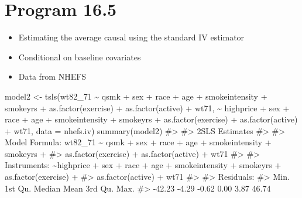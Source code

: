 \documentclass[
  10pt,
  a4paper,
]{book}
\newenvironment{Shaded}{\begin{snugshade}}{\end{snugshade}}
\newcommand{\AttributeTok}[1]{\textcolor[rgb]{0.40,0.45,0.13}{#1}}
\newcommand{\CommentTok}[1]{\textcolor[rgb]{0.37,0.37,0.37}{#1}}
\newcommand{\FunctionTok}[1]{\textcolor[rgb]{0.28,0.35,0.67}{#1}}
\newcommand{\NormalTok}[1]{\textcolor[rgb]{0.00,0.46,0.62}{#1}}
\newcommand{\OtherTok}[1]{\textcolor[rgb]{0.00,0.46,0.62}{#1}}
\newcommand{\SpecialCharTok}[1]{\textcolor[rgb]{0.37,0.37,0.37}{#1}}
\providecommand{\tightlist}{%
  \setlength{\itemsep}{0pt}\setlength{\parskip}{0pt}}
\begin{document}
\section{Program 16.5}\label{program-16.5}

\begin{itemize}
\tightlist
\item
  Estimating the average causal using the standard IV estimator
\item
  Conditional on baseline covariates
\item
  Data from NHEFS
\end{itemize}

\begin{Shaded}
\begin{Highlighting}[]
\NormalTok{model2 }\OtherTok{\textless{}{-}} \FunctionTok{tsls}\NormalTok{(wt82\_71 }\SpecialCharTok{\textasciitilde{}}\NormalTok{ qsmk }\SpecialCharTok{+}\NormalTok{ sex }\SpecialCharTok{+}\NormalTok{ race }\SpecialCharTok{+}\NormalTok{ age }\SpecialCharTok{+}\NormalTok{ smokeintensity }\SpecialCharTok{+}\NormalTok{ smokeyrs }\SpecialCharTok{+}
                      \FunctionTok{as.factor}\NormalTok{(exercise) }\SpecialCharTok{+} \FunctionTok{as.factor}\NormalTok{(active) }\SpecialCharTok{+}\NormalTok{ wt71,}
             \SpecialCharTok{\textasciitilde{}}\NormalTok{ highprice }\SpecialCharTok{+}\NormalTok{ sex }\SpecialCharTok{+}\NormalTok{ race }\SpecialCharTok{+}\NormalTok{ age }\SpecialCharTok{+}\NormalTok{ smokeintensity }\SpecialCharTok{+}\NormalTok{ smokeyrs }\SpecialCharTok{+} \FunctionTok{as.factor}\NormalTok{(exercise) }\SpecialCharTok{+}
               \FunctionTok{as.factor}\NormalTok{(active) }\SpecialCharTok{+}\NormalTok{ wt71, }\AttributeTok{data =}\NormalTok{ nhefs.iv)}
\FunctionTok{summary}\NormalTok{(model2)}
\CommentTok{\#\textgreater{} }
\CommentTok{\#\textgreater{}  2SLS Estimates}
\CommentTok{\#\textgreater{} }
\CommentTok{\#\textgreater{} Model Formula: wt82\_71 \textasciitilde{} qsmk + sex + race + age + smokeintensity + smokeyrs + }
\CommentTok{\#\textgreater{}     as.factor(exercise) + as.factor(active) + wt71}
\CommentTok{\#\textgreater{} }
\CommentTok{\#\textgreater{} Instruments: \textasciitilde{}highprice + sex + race + age + smokeintensity + smokeyrs + as.factor(exercise) + }
\CommentTok{\#\textgreater{}     as.factor(active) + wt71}
\CommentTok{\#\textgreater{} }
\CommentTok{\#\textgreater{} Residuals:}
\CommentTok{\#\textgreater{}    Min. 1st Qu.  Median    Mean 3rd Qu.    Max. }
\CommentTok{\#\textgreater{}  {-}42.23   {-}4.29   {-}0.62    0.00    3.87   46.74 }

\end{Highlighting}
\end{Shaded}
\end{document}

